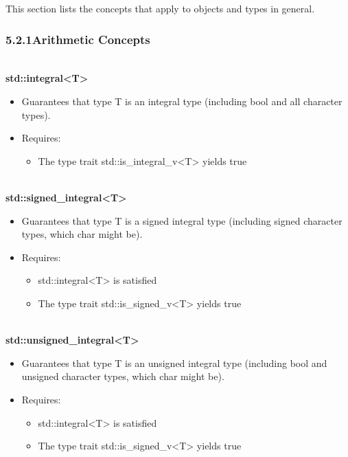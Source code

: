 

This section lists the concepts that apply to objects and types in general.



\subsubsection*{ 5.2.1\hspace{0.2cm}Arithmetic Concepts}



\noindent
\hspace*{\fill} \\ %
\textbf{std::integral<T>}

\begin{itemize}
\item
Guarantees that type T is an integral type (including bool and all character types).

\item
Requires:
\begin{itemize}
\item
The type trait std::is\_integral\_v<T> yields true
\end{itemize}
\end{itemize}


\noindent
\hspace*{\fill} \\ %
\textbf{std::signed\_integral<T>}

\begin{itemize}
\item
Guarantees that type T is a signed integral type (including signed character types, which char might be).

\item
Requires:
\begin{itemize}
\item
std::integral<T> is satisfied

\item
The type trait std::is\_signed\_v<T> yields true
\end{itemize}
\end{itemize}

\noindent
\hspace*{\fill} \\ %
\textbf{std::unsigned\_integral<T>}

\begin{itemize}
\item
Guarantees that type T is an unsigned integral type (including bool and unsigned character types, which char might be).

\item
Requires:
\begin{itemize}
\item
std::integral<T> is satisfied

\item
The type trait std::is\_signed\_v<T> yields true
\end{itemize}
\end{itemize}

